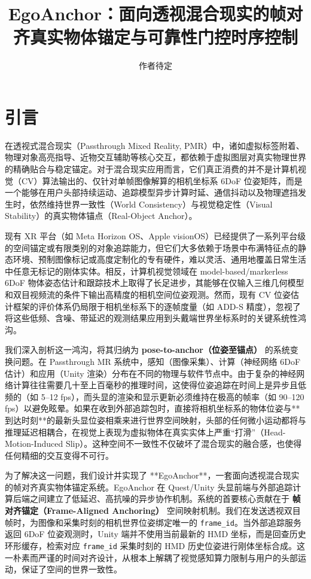 \documentclass[review]{vgtc}
\title{EgoAnchor：面向透视混合现实的帧对齐真实物体锚定与可靠性门控时序控制}
\author{作者待定}
\begin{document}
\maketitle

\section{引言}

在透视式混合现实（Passthrough Mixed Reality, PMR）中，诸如虚拟标签附着、物理对象高亮指导、近物交互辅助等核心交互，都依赖于虚拟图层对真实物理世界的精确贴合与稳定锚定。对于混合现实应用而言，它们真正消费的并不是计算机视觉（CV）算法输出的、仅针对单帧图像解算的相机坐标系 6DoF 位姿矩阵，而是一个能够在用户头部持续运动、追踪模型异步计算时延、通信抖动以及物理遮挡发生时，依然维持世界一致性（World Consistency）与视觉稳定性（Visual Stability）的真实物体锚点（Real-Object Anchor）。

现有 XR 平台（如 Meta Horizon OS、Apple visionOS）已经提供了一系列平台级的空间锚定或有限类别的对象追踪能力，但它们大多依赖于场景中布满特征点的静态环境、预制图像标记或高度定制化的专有硬件，难以灵活、通用地覆盖日常生活中任意无标记的刚体实体。相反，计算机视觉领域在 model-based/markerless 6DoF 物体姿态估计和跟踪技术上取得了长足进步，其能够在仅输入三维几何模型和双目视频流的条件下输出高精度的相机空间位姿观测。然而，现有 CV 位姿估计框架的评价体系仍局限于相机坐标系下的逐帧度量（如 ADD-S 精度），忽视了将这些低频、含噪、带延迟的观测结果应用到头戴端世界坐标系时的关键系统性鸿沟。

我们深入剖析这一鸿沟，将其归纳为 \textbf{pose-to-anchor（位姿至锚点）} 的系统变换问题。在 Passthrough MR 系统中，感知（图像采集）、计算（神经网络 6DoF 估计）和应用（Unity 渲染）分布在不同的物理与软件节点中。由于复杂的神经网络计算往往需要几十至上百毫秒的推理时间，这使得位姿追踪在时间上是异步且低频的（如 5--12 fps），而头显的渲染和显示更新必须维持在极高的帧率（如 90--120 fps）以避免眩晕。如果在收到外部追踪包时，直接将相机坐标系的物体位姿与**到达时刻**的最新头显位姿相乘来进行世界空间映射，头部的任何微小运动都将与推理延迟相耦合，在视觉上表现为虚拟物体在真实实体上严重“打滑”（Head-Motion-Induced Slip）。这种空间不一致性不仅破坏了混合现实的融合感，也使得任何精细的交互变得不可行。

为了解决这一问题，我们设计并实现了 **EgoAnchor**，一套面向透视混合现实的帧对齐真实物体锚定系统。EgoAnchor 在 Quest/Unity 头显前端与外部追踪计算后端之间建立了低延迟、高抗噪的异步协作机制。系统的首要核心贡献在于 \textbf{帧对齐锚定（Frame-Aligned Anchoring）} 空间映射机制。我们在发送透视双目帧时，为图像和采集时刻的相机世界位姿绑定唯一的 \texttt{frame\_id}。当外部追踪服务返回 6DoF 位姿观测时，Unity 端并不使用当前最新的 HMD 坐标，而是回查历史环形缓存，检索对应 \texttt{frame\_id} 采集时刻的 HMD 历史位姿进行刚体坐标合成。这一朴素而严谨的时间对齐设计，从根本上解耦了视觉感知算力限制与用户的头部运动，保证了空间的世界一致性。
\end{document}
